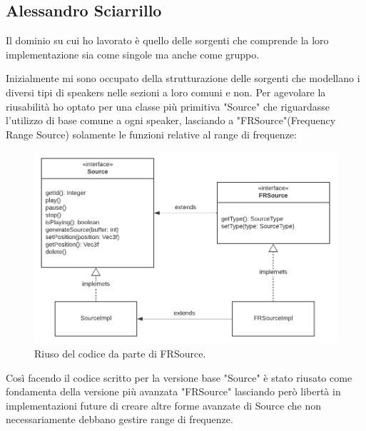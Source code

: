 \documentclass[a4paper,12pt]{report}
\begin{document}
\subsection*{Alessandro Sciarrillo}
Il dominio su cui ho lavorato è quello delle sorgenti che comprende la loro implementazione sia come singole ma anche come gruppo.

Inizialmente mi sono occupato della strutturazione delle sorgenti che modellano i diversi tipi di speakers nelle sezioni a loro comuni e non. Per agevolare la riusabilità ho optato per una classe più primitiva "Source" che riguardasse l'utilizzo di base comune a ogni speaker, lasciando a "FRSource"(Frequency Range Source) solamente le funzioni relative al range di frequenze:
%
\begin{figure}[H]
\centering{}
\includegraphics[width=\textwidth]{img/source/Source-FRSource.png}
\caption{Riuso del codice da parte di FRSource.}
\label{img:sourcesAndFRSource}
\end{figure}

Così facendo il codice scritto per la versione base "Source" è stato riusato come fondamenta della versione più avanzata "FRSource"
lasciando però libertà in implementazioni future di creare altre forme avanzate di Source che non necessariamente debbano gestire
range di frequenze.
\end{document}
